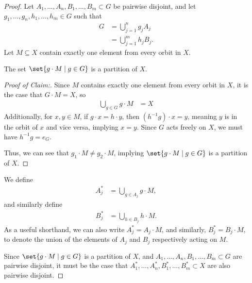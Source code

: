 \begin{proof}
  Let $A_1,\dots,A_n,B_1,\dots,B_m\subset G$ be pairwise disjoint, and let $g_1,\dots,g_n,h_1,\dots,h_m\in G$ such that
  \begin{align*}
    G &= \bigcup_{j=1}^{n}g_jA_j\\
      &= \bigcup_{j=1}^{m}h_jB_j.
  \end{align*}
  Let $M\subseteq X$ contain exactly one element from every orbit in $X$.\newline
  \begin{claim}
  The set $\set{g\cdot M\mid g\in G}$ is a partition of $X$.
  \end{claim}
  \begin{proof}[Proof of Claim:]
  Since $M$ contains exactly one element from every orbit in $X$, it is the case that $G\cdot M = X$, so
  \begin{align*}
    \bigcup_{g\in G} g\cdot M &= X
  \end{align*}
  Additionally, for $x,y\in M$, if $g\cdot x = h\cdot y$, then $\left(h^{-1}g\right)\cdot x = y$, meaning $y$ is in the orbit of $x$ and vice versa, implying $x = y$. Since $G$ acts freely on $X$, we must have $h^{-1}g = e_G$.\newline

  Thus, we can see that $g_1\cdot M \neq g_2\cdot M$, implying $\set{g\cdot M\mid g\in G}$ is a partition of $X$.
  \end{proof}

  We define
  \begin{align*}
    A_j^{\ast} &= \bigcup_{g\in A_j}g\cdot M,
  \end{align*}
  and similarly define
  \begin{align*}
    B_j^{\ast} &= \bigcup_{h\in B_j}h\cdot M.
  \end{align*}
  As a useful shorthand, we can also write $A_j^{\ast} = A_j\cdot M$, and similarly, $B_j^{\ast} = B_j\cdot M$, to denote the union of the elements of $A_j$ and $B_j$ respectively acting on $M$.\newline

  Since $\set{g\cdot M\mid g\in G}$ is a partition of $X$, and $A_1,\dots,A_n,B_1,\dots,B_m\subset G$ are pairwise disjoint, it must be the case that $A_1^{\ast},\dots,A_n^{\ast},B_1^{\ast},\dots,B_m^{\ast}\subset X$ are also pairwise disjoint.\newline


\end{proof}
